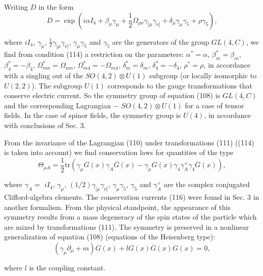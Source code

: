 \documentclass[a4paper,12pt]{article}
\begin{document}
Writing $D$ in the form
\begin{equation}
D=\exp \left( i\alpha I_4+\beta _\mu \gamma _\mu +\frac 12\Omega
_{\mu \nu }\gamma _{[\mu }\gamma _{\nu ]}+\delta _\mu \gamma _\mu
\gamma _5+\rho \gamma _5\right) , \label{115}
\end{equation}

where $iI_4$, $\gamma _\mu $, $\frac 12\gamma _{[\mu }\gamma _{\nu
]}$, $ \gamma _\mu \gamma _5$ and $\gamma _5$ are the generators
of the group $ GL(4,C)$, we find from condition (114) a
restriction on the parameters: $ \alpha ^{*}=\alpha $, $\beta
_m^{*}=\beta _m$, $\beta _4^{*}=-\beta _4$, $ \Omega
_{mn}^{*}=\Omega _{mn}$, $\Omega _{m4}^{*}=-\Omega _{m4}$, $\delta
_m^{*}=\delta _m$, $\delta _4^{*}=-\delta _4$, $\rho ^{*}=\rho $,
in accordance with a singling out of the $SO(4,2)\otimes U(1)$
subgroup (or locally isomorphic to $U(2,2)$). The subgroup $U(1)$
corresponds to the gauge transformations that conserve electric
current. So the symmetry group of equation (108) is $GL(4,C)$ and
the corresponding Lagrangian $-$ $ SO(4,2)\otimes U(1)$ for a case
of tensor fields. In the case of spinor fields, the symmetry group
is $U(4)$, in accordance with conclusions of Sec. 3.

From the invariance of the Lagrangian (110) under transformations
(111) ((114) is taken into account) we find conservation laws for
quantities of the type
\begin{equation}
\Theta _{\mu A}=\frac 12\mbox{tr}\left( \gamma _\mu G(x)\gamma
_A\overline{G} (x)-\gamma _\mu G(x)\gamma _4\gamma _A^{+}\gamma
_4\overline{G}(x)\right) ,\label{116}
\end{equation}

where $\gamma _A=$ $iI_4$, $\gamma _\mu $, $(1/2)\gamma _{[\mu
}\gamma _{\nu ]}$, $\gamma _\mu \gamma _5$, $\gamma _5$ and
$\gamma _A^{+}$ are the complex conjugated Clifford-algebra
elements. The conservation currents (116) were found in Sec. 3 in
another formalism. From the physical standpoint, the appearance of
this symmetry results from a mass degeneracy of the spin states of
the particle which are mixed by transformations (111). The
symmetry is preserved in a nonlinear generalization of equation
(108) (equations of the Heisenberg type):
\begin{equation}
\left( \gamma _\mu \partial _\mu +m\right)
G(x)+lG(x)\overline{G}(x)G(x)=0  ,\label{117}
\end{equation}

where $l$ is the coupling constant.
\end{document}

